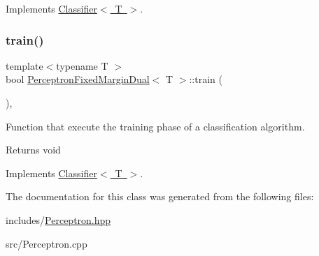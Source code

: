 Implements \mbox{\hyperlink{class_classifier_ab3b9544a8d9c3cbde8d5865c7e9be0fb}{Classifier$<$ T $>$}}.

\mbox{\label{class_perceptron_fixed_margin_dual_a58a5acdd6afaedff53fab23779f01486}} 
\subsubsection{\texorpdfstring{train()}{train()}}
{\footnotesize\ttfamily template$<$typename T $>$ \\
bool \mbox{\hyperlink{class_perceptron_fixed_margin_dual}{Perceptron\+Fixed\+Margin\+Dual}}$<$ T $>$\+::train (\begin{DoxyParamCaption}{ }\end{DoxyParamCaption})\hspace{0.3cm}{\ttfamily [override]}, {\ttfamily [virtual]}}



Function that execute the training phase of a classification algorithm. 

\begin{DoxyReturn}{Returns}
void 
\end{DoxyReturn}


Implements \mbox{\hyperlink{class_classifier_a120849bfdfa3ba7a0388b32b2d76bf4f}{Classifier$<$ T $>$}}.



The documentation for this class was generated from the following files\+:\begin{DoxyCompactItemize}
\item 
includes/\mbox{\hyperlink{_perceptron_8hpp}{Perceptron.\+hpp}}\item 
src/Perceptron.\+cpp\end{DoxyCompactItemize}
